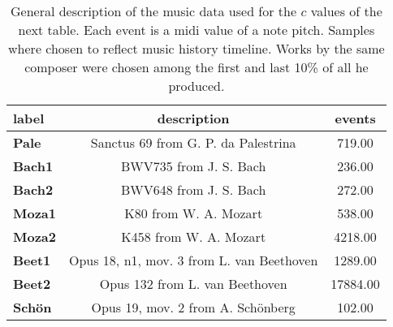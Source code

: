 \begin{table}[h!]
\begin{center}
\begin{tabular}{| l || c | c |}\hline
label & description & events \\\hline\hline
{\bf Pale} & Sanctus 69 from G. P. da Palestrina & 719.00 \\\hline
{\bf Bach1} & BWV735 from J. S. Bach & 236.00 \\\hline
{\bf Bach2} & BWV648 from J. S. Bach & 272.00 \\\hline
{\bf Moza1} & K80 from W. A. Mozart & 538.00 \\\hline
{\bf Moza2} & K458 from W. A. Mozart & 4218.00 \\\hline
{\bf Beet1} & Opus 18, n1, mov. 3 from L. van Beethoven & 1289.00 \\\hline
{\bf Beet2} & Opus 132 from L. van Beethoven & 17884.00 \\\hline
{\bf Sch\"on} & Opus 19, mov. 2 from A. Sch\"onberg & 102.00 \\\hline
\end{tabular}
\caption{General description of the music data used for the $c$ values of the next table. Each event is a midi value of a note pitch. Samples where chosen to reflect music history timeline. Works by the same composer were chosen among the first and last 10\% of all he produced.}
\end{center}
\end{table}